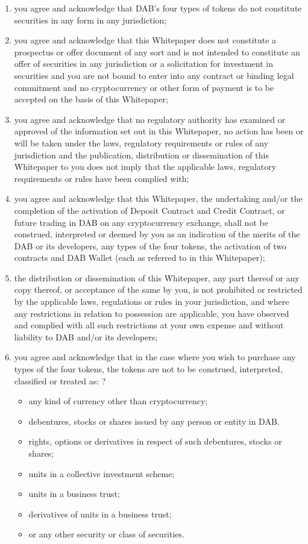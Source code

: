 \documentclass[review]{elsarticle}
\begin{document}
\begin{enumerate}
   \item you agree and acknowledge that DAB's four types of tokens do not constitute securities in any form in any jurisdiction;
   \item you agree and acknowledge that this Whitepaper does not constitute a prospectus or offer document of any sort and is not intended to constitute an offer of securities in any jurisdiction or a solicitation for investment in securities and you are not bound to enter into any contract or binding legal commitment and no cryptocurrency or other form of payment is to be accepted on the basis of this Whitepaper;
   \item you agree and acknowledge that no regulatory authority has examined or approved of the information set out in this Whitepaper, no action has been or will be taken under the laws, regulatory requirements or rules of any jurisdiction and the publication, distribution or dissemination of this Whitepaper to you does not imply that the applicable laws, regulatory requirements or rules have been complied with;
   \item you agree and acknowledge that this Whitepaper, the undertaking and/or the completion of the activation of Deposit Contract and Credit Contract, or future trading in DAB on any cryptocurrency exchange, shall not be construed, interpreted or deemed by you as an indication of the merits of the DAB or its developers, any types of the four tokens, the activation of two contracts and DAB Wallet (each as referred to in this Whitepaper);
   \item the distribution or dissemination of this Whitepaper, any part thereof or any copy thereof, or acceptance of the same by you, is not prohibited or restricted by the applicable laws, regulations or rules in your jurisdiction, and where any restrictions in relation to possession are applicable, you have observed and complied with all such restrictions at your own expense and without liability to DAB and/or its developers;
   \item you agree and acknowledge that in the case where you wish to purchase any types of the four tokens, the tokens are not to be construed, interpreted, classified or treated as:
?\begin{itemize}
   \item any kind of currency other than cryptocurrency;
   \item debentures, stocks or shares issued by any person or entity in DAB.
   \item rights, options or derivatives in respect of such debentures, stocks or shares;
   \item units in a collective investment scheme;
   \item units in a business trust;
   \item derivatives of units in a business trust;
   \item or any other security or class of securities.
\end{itemize}


\end{enumerate}
\end{document}
